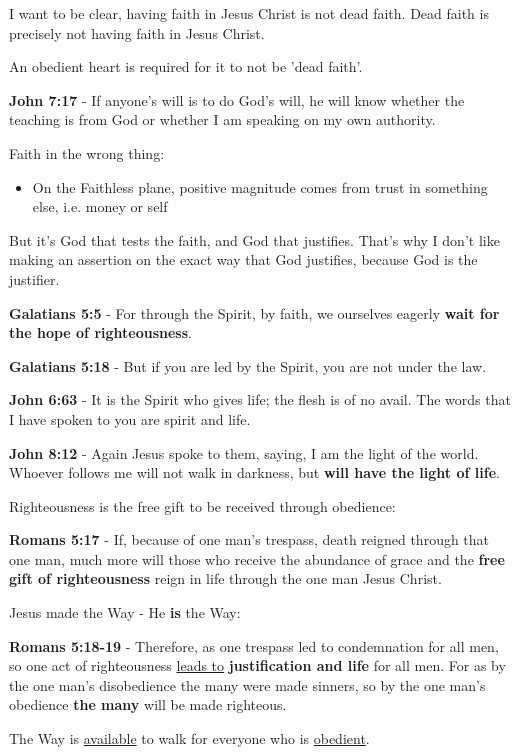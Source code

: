 \documentclass[11pt]{article}
\begin{document}
I want to be clear, having faith in Jesus Christ is not dead faith.
Dead faith is precisely not having faith in Jesus Christ.

An obedient heart is required for it to not be 'dead faith'.

\textbf{John 7:17} - If anyone's will is to do God's will, he will know whether the teaching is from God or whether I am speaking on my own authority.

Faith in the wrong thing:
\begin{itemize}
\item On the Faithless plane, positive magnitude comes from trust in something else, i.e. money or self
\end{itemize}

But it's God that tests the faith, and God that justifies. That's why I don't like making an assertion on the exact way that God justifies, because God is the justifier.

\textbf{Galatians 5:5} - For through the Spirit, by faith, we ourselves eagerly \textbf{wait for the hope of righteousness}.

\textbf{Galatians 5:18} - But if you are led by the Spirit, you are not under the law.

\textbf{John 6:63} - It is the Spirit who gives life; the flesh is of no avail. The words that I have spoken to you are spirit and life.

\textbf{John 8:12} - Again Jesus spoke to them, saying, I am the light of the world. Whoever follows me will not walk in darkness, but \textbf{will have the light of life}.

Righteousness is the free gift to be received through obedience:

\textbf{Romans 5:17} - If, because of one man's trespass, death reigned through that one man, much more will those who receive the abundance of grace and the \textbf{free gift of righteousness} reign in life through the one man Jesus Christ.

Jesus made the Way - He \textbf{is} the Way:

\textbf{Romans 5:18-19} - Therefore, as one trespass led to condemnation for all men, so one act of righteousness \uline{leads to} \textbf{justification and life} for all men. For as by the one man's disobedience the many were made sinners, so by the one man's obedience \textbf{the many} will be made righteous.

The Way is \uline{available} to walk for everyone who is \uline{obedient}.
\end{document}
